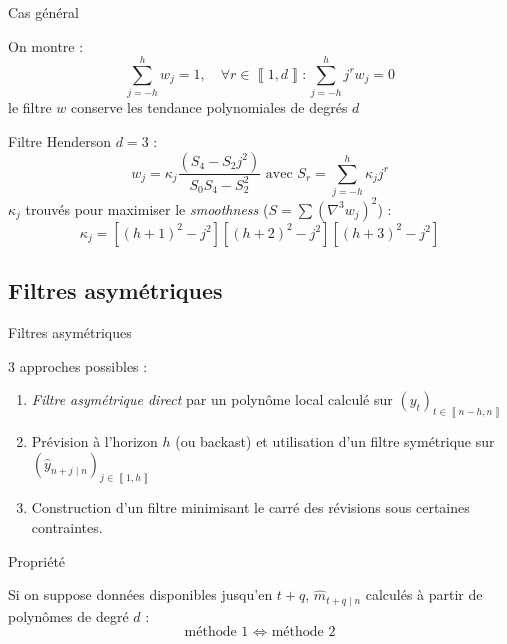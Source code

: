 \documentclass[10pt,xcolor=table,color={dvipsnames,usenames},ignorenonframetext,usepdftitle=false,french]{beamer}
\begin{document}
\begin{frame}{Cas général}
\protect\hypertarget{cas-guxe9nuxe9ral-1}{}

On montre : \[
\sum_{j=-h}^{h}w_{j}=1,\quad\forall r\in\left\llbracket 1,d\right\rrbracket :\sum_{j=-h}^{h}j^{r}w_{j}=0
\] \faArrowCircleRight{} le filtre \(w\) conserve les tendance
polynomiales de degrés \(d\)

\pause

Filtre Henderson \(d=3\) : \[
w_{j}=\kappa_{j}\frac{(S_{4}-S_{2}j^{2})}{S_{0}S_{4}-S_{2}^{2}}\text{ avec }S_{r}=\sum_{j=-h}^{h}\kappa_{j}j^{r}
\] \(\kappa_j\) trouvés pour maximiser le \emph{smoothness}
(\(S=\sum(\nabla^{3}w_{j})^{2}\)) : \[
\kappa_{j}=\left[(h+1)^{2}-j^{2}\right]\left[(h+2)^{2}-j^{2}\right]\left[(h+3)^{2}-j^{2}\right]
\]

\end{frame}

\hypertarget{filtres-asymuxe9triques}{%
\subsection{Filtres asymétriques}\label{filtres-asymuxe9triques}}

\begin{frame}{Filtres asymétriques}
\protect\hypertarget{filtres-asymuxe9triques-1}{}

3 approches possibles :

\begin{enumerate}
\item
  \emph{Filtre asymétrique direct} par un polynôme local calculé sur
  \((y_{t})_{t\in\left\llbracket n-h,n\right\rrbracket }\)
\item
  Prévision à l'horizon \(h\) (ou backast) et utilisation d'un filtre
  symétrique sur
  \((\hat{y}_{n+j\mid n})_{j\in\left\llbracket 1,h\right\rrbracket}\)
\item
  Construction d'un filtre minimisant le carré des révisions sous
  certaines contraintes.
\end{enumerate}

\pause

\begin{block}{Propriété}

Si on suppose données disponibles jusqu'en \(t+q\),
\(\hat{m}_{t+q\mid n}\) calculés à partir de polynômes de degré \(d\) :
\[\text{méthode 1 }\iff \text{ méthode 2}\]

\end{block}

\end{frame}
\end{document}
